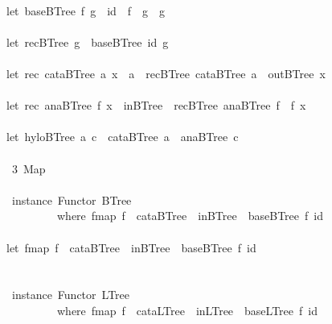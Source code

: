 \documentclass[a4paper]{article}
\begin{document}
\begin{tabbing}
\ttfamily ~~~~~\\
\ttfamily ~let~baseBTree~f~g~~id~~f~~g~~g\\
\ttfamily ~\\
\ttfamily ~let~recBTree~g~~baseBTree~id~g\\
\ttfamily ~\\
\ttfamily ~let~rec~cataBTree~a~x~~a~~recBTree~cataBTree~a~~outBTree~x~\\
\ttfamily ~\\
\ttfamily ~let~rec~anaBTree~f~x~~inBTree~~recBTree~anaBTree~f~~f~x\\
\ttfamily ~\\
\ttfamily ~let~hyloBTree~a~c~~cataBTree~a~~anaBTree~c\\
\ttfamily ~\\
\ttfamily ~~3~Map~\\
\ttfamily ~\\
\ttfamily ~~instance~Functor~BTree\\
\ttfamily ~~~~~~~~~~where~fmap~f~~cataBTree~~inBTree~~baseBTree~f~id~\\
\ttfamily ~\\
\ttfamily ~let~fmap~f~~cataBTree~~inBTree~~baseBTree~f~id~\\
\ttfamily ~\\
\ttfamily ~\\
\ttfamily ~~instance~Functor~LTree\\
\ttfamily ~~~~~~~~~~where~fmap~f~~cataLTree~~inLTree~~baseLTree~f~id~\\

\end{tabbing}
\end{document}
